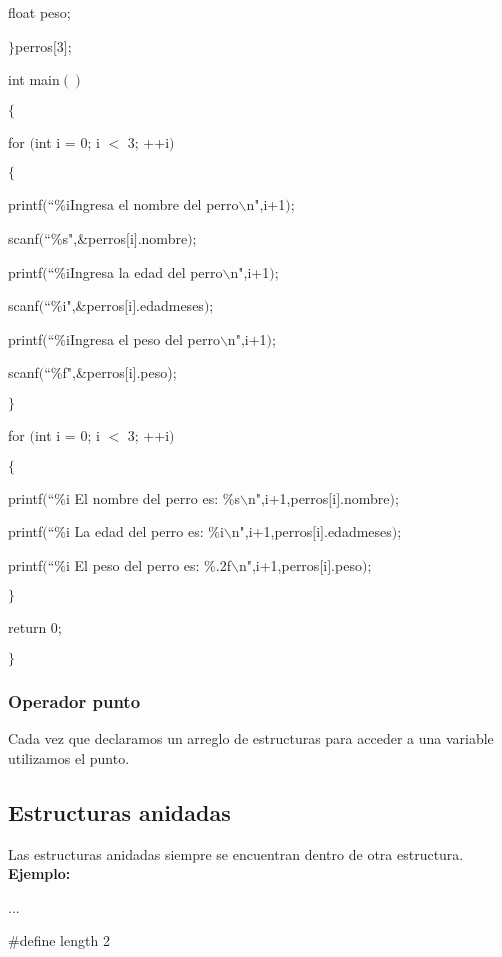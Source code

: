 \documentclass[]{article}
\begin{document}
	float peso;
	
	$\rbrace$perros$[$3$]$;
	
	int main$()$
	
	$\lbrace$
	
	for $($int i = 0; i $<$ 3; ++i$)$
	
	$\lbrace$
	
	printf$($``\%iIngresa el nombre del perro$\backslash$n",i+1$)$;
	
	scanf$($``\%s",\&perros$[$i$]$.nombre$)$;
	
	printf$($``\%iIngresa la edad del perro$\backslash$n",i+1$)$;
	
	scanf$($``\%i",\&perros$[$i$]$.edadmeses$)$;
	
	printf$($``\%iIngresa el peso del perro$\backslash$n",i+1$)$;
	
	scanf$($``\%f",\&perros$[$i$]$.peso);
	
	$\rbrace$
	
	for $($int i = 0; i $<$ 3; ++i$)$
	
	$\lbrace$
	
	printf$($``\%i El nombre del perro es: \%s$\backslash$n",i+1,perros$[$i$]$.nombre$)$;
	
	printf$($``\%i La edad del perro es: \%i$\backslash$n",i+1,perros$[$i$]$.edadmeses$)$;
	
	printf$($``\%i El peso del perro es: \%.2f$\backslash$n",i+1,perros$[$i$]$.peso$)$;
	
	$\rbrace$
	
	return 0;
	
	$\rbrace$
	
	\subsubsection{Operador punto}
	
	Cada vez que declaramos un arreglo de estructuras para acceder a una variable utilizamos el punto.
	
	\subsection{Estructuras anidadas}
	Las estructuras anidadas siempre se encuentran dentro de otra estructura.\\
	
	\textbf{Ejemplo:\\}
	
	...
	
	\#define length 2
	
\end{document}
